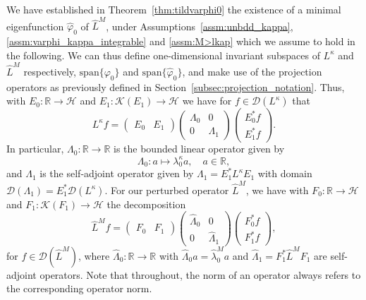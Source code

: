 \documentclass{aptpub}
\newcommand{\R}{\mathbb R}
\newcommand{\Lk}{L^\kappa}
\newcommand{\lkap}{\lambda_0^\kappa}
\newcommand{\Dom}{\mathcal D}
\newcommand{\lspan}{\mathrm{span}}
\renewcommand{\H}{\mathcal H}
\begin{document}
We have established in Theorem~\ref{thm:tildvarphi0} the existence of a minimal eigenfunction $\widehat \varphi_0$ of $\widehat L^M$, under Assumptions~\ref{assm:unbdd_kappa}, \ref{assm:varphi_kappa_integrable} and \ref{assm:M>lkap} which we assume to hold in the following. We can thus define one-dimensional invariant subspaces of $\Lk$ and $\widehat L^M$ respectively, $\lspan\{\varphi_0\}$ and $\lspan\{\widehat  \varphi_0\}$, and make use of the projection operators 
as previously defined in Section~\ref{subsec:projection_notation}. 
Thus, with $E_0: \R \to \H$ and $E_1: \mathcal K(E_1)\to \H$ we have for $f\in \Dom(\Lk)$ that
\begin{equation*}
    \Lk f=    
    \begin{pmatrix}
        E_0 & E_1
    \end{pmatrix}
    \begin{pmatrix}
        \Lambda_0 & 0\\
        0 & \Lambda_1
    \end{pmatrix}
    \begin{pmatrix}
        E_0^*f\\
        E_1^*f
    \end{pmatrix}.
\end{equation*}
In particular, $\Lambda_0:\R\to\R$ is the bounded linear operator given by
\begin{equation*}
    \Lambda_0: a \mapsto \lkap a, \quad a\in\R,
\end{equation*}
and $\Lambda_1$ is the self-adjoint operator given by $\Lambda_1=E_1^* \Lk E_1$ with domain $\Dom(\Lambda_1) = E_1^* \Dom(\Lk)$.
For our perturbed operator $\widehat L^M$, we have with $F_0: \R\to \H$ and $F_1: \mathcal K(F_1)\to \H$ the decomposition \begin{equation*}
    \widehat L^M f=
    \begin{pmatrix}
        F_0 & F_1
    \end{pmatrix}
    \begin{pmatrix}
        \widehat \Lambda_0 & 0 \\
        0 & \widehat \Lambda_1 
    \end{pmatrix}
    \begin{pmatrix}
        F_0^*f \\
        F_1^*f
    \end{pmatrix},
\end{equation*}
for $f \in \Dom(\widehat L^M)$, where $\widehat{\Lambda}_0 \colon \R \to 
\R$ with $\widehat{\Lambda}_0 a = \widehat{\lambda}_0^M a$ and
$\widehat \Lambda_1=F_1^* \widehat L^M F_1$ are self-adjoint operators. Note that throughout, the norm of an operator always refers to the corresponding operator norm.
\end{document}
